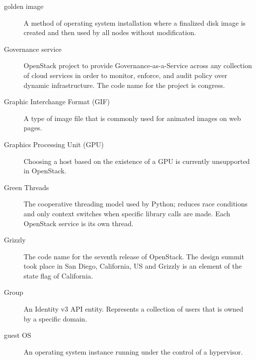 \documentclass[letterpaper,10pt,english]{sphinxmanual}
\begin{document}
\begin{description}
\item[{golden image}] \leavevmode{}\label{_source/glossary:term-golden-image}
A method of operating system installation where a finalized disk
image is created and then used by all nodes without
modification.

\item[{Governance service}] \leavevmode{}\label{_source/glossary:term-governance-service}
OpenStack project to provide Governance-as-a-Service across
any collection of cloud services in order to monitor,
enforce, and audit policy over dynamic infrastructure. The
code name for the project is congress.

\item[{Graphic Interchange Format (GIF)}] \leavevmode{}\label{_source/glossary:term-graphic-interchange-format-gif}
A type of image file that is commonly used for animated images
on web pages.

\item[{Graphics Processing Unit (GPU)}] \leavevmode{}\label{_source/glossary:term-graphics-processing-unit-gpu}
Choosing a host based on the existence of a GPU is currently
unsupported in OpenStack.

\item[{Green Threads}] \leavevmode{}\label{_source/glossary:term-green-threads}
The cooperative threading model used by Python; reduces race
conditions and only context switches when specific library calls are
made. Each OpenStack service is its own thread.

\item[{Grizzly}] \leavevmode{}\label{_source/glossary:term-grizzly}
The code name for the seventh release of
OpenStack. The design summit took place in
San Diego, California, US and Grizzly is an element of the state flag of
California.

\item[{Group}] \leavevmode{}\label{_source/glossary:term-group}
An Identity v3 API entity. Represents a collection of users that is
owned by a specific domain.

\item[{guest OS}] \leavevmode{}\label{_source/glossary:term-guest-os}
An operating system instance running under the control of a
hypervisor.

\end{description}
\end{document}
